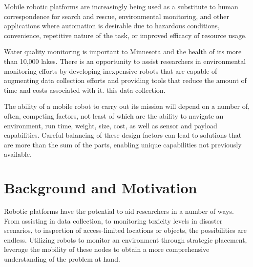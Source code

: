 
Mobile robotic platforms are increasingly being used as a substitute to human correspondence for search and rescue, environmental monitoring, and other applications where automation is desirable due to hazardous conditions, convenience, repetitive nature of the task, or improved efficacy of resource usage. 

Water quality monitoring is important to Minnesota and the health of its more than 10,000 lakes. There is an opportunity to assist researchers in environmental monitoring efforts by developing inexpensive robots that are capable of augmenting data collection efforts and providing tools that reduce the amount of time and costs associated with it. this data collection. 

The ability of a mobile robot to carry out its mission will depend on a number of, often, competing factors, not least of which are the ability to navigate an environment, run time, weight, size, cost, as well as sensor and payload capabilities. Careful balancing of these design factors can lead to solutions that are more than the sum of the parts, enabling unique capabilities not previously available.

\section{Background and Motivation}
	\label{sec:background_and_motivation}


	Robotic platforms have the potential to aid researchers in a number of ways.  From assisting in data collection, to monitoring toxicity levels in disaster scenarios, to inspection of access-limited locations or objects, the possibilities are endless. Utilizing robots to monitor an environment through strategic placement, leverage the mobility of these nodes to obtain a more comprehensive understanding of the problem at hand. 

